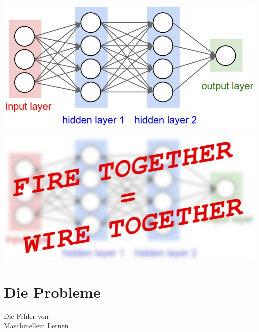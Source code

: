 \documentclass[aspectratio=169,x11names]{beamer}
\begin{document}
\begin{frame}
\begin{center}
\includegraphics[width=\textwidth]{images/simple_neural_network_header.jpg} 
\end{center}
\end{frame}

\begin{frame}
\begin{center}
\includegraphics[width=\textwidth]{images/simple_neural_network_header_FW.jpg} 
\end{center}
\end{frame}



\section{Die Probleme}

\begin{frame}
\begin{center}
\huge
Die Fehler von\\Maschinellem Lernen
\end{center}
\end{frame}
\end{document}
